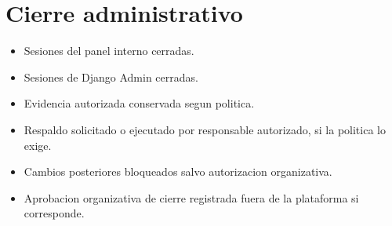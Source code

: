 \section*{Cierre administrativo}
\begin{itemize}
    \item[\casilla] Sesiones del panel interno cerradas.
    \item[\casilla] Sesiones de Django Admin cerradas.
    \item[\casilla] Evidencia autorizada conservada segun politica.
    \item[\casilla] Respaldo solicitado o ejecutado por responsable autorizado, si la politica lo exige.
    \item[\casilla] Cambios posteriores bloqueados salvo autorizacion organizativa.
    \item[\casilla] Aprobacion organizativa de cierre registrada fuera de la plataforma si corresponde.
\end{itemize}
